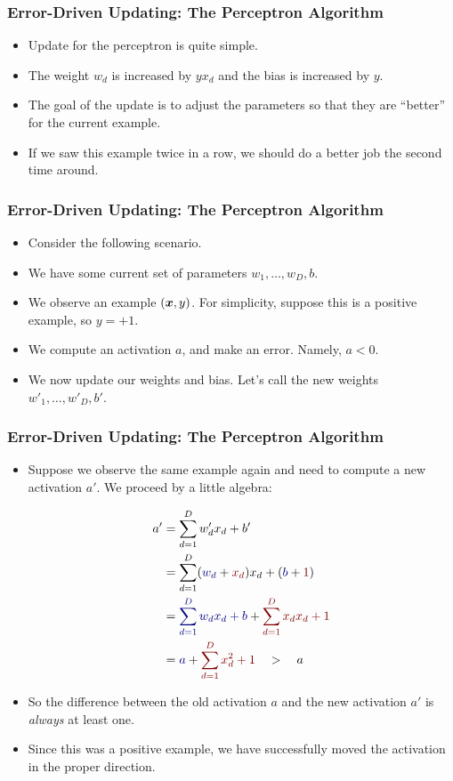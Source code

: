 \documentclass[trans]{beamer}
\begin{document}
\begin{frame}
  \frametitle{Error-Driven Updating: The Perceptron Algorithm}
\begin{itemize}
\item
Update for the perceptron is quite simple.  
\item The
weight $w_d$ is increased by $y x_d$ and the bias is increased by
$y$.  
\item The goal of the update is to adjust the parameters so that they
are ``better'' for the current example. 
\item If we saw
this example twice in a row, we should do a better job the second time
around.
\end{itemize}
\end{frame}

\begin{frame}
  \frametitle{Error-Driven Updating: The Perceptron Algorithm}
\begin{itemize}
\item
Consider the
following scenario.  
\item We have some current set of parameters $w_1,
\dots, w_D, b$.  
\item We observe an example $({\boldsymbol{x}},y)$.  For simplicity,
suppose this is a positive example, so $y=+1$.
\item  We compute an
activation $a$, and make an error.  Namely, $a<0$.  
\item We now update our
weights and bias.  Let's call the new weights $w'_1, \dots, w'_D,
b'$.  
\end{itemize}
\end{frame}

\begin{frame}
  \frametitle{Error-Driven Updating: The Perceptron Algorithm}
\begin{itemize}
\item Suppose we observe the same example again and need to compute a
new activation $a'$.  We proceed by a little algebra:
\begin{scriptsize}
\begin{align}
a'
&= \sum_{d=1}^D w'_d x_d + b' \\
&= \sum_{d=1}^D (\textcolor{darkblue}{w_d} + \textcolor{darkred}{x_d}) x_d + (\textcolor{darkblue}{b} + \textcolor{darkred}{1}) \\
&= \textcolor{darkblue}{\sum_{d=1}^D w_d x_d + b} + \textcolor{darkred}{\sum_{d=1}^D x_d x_d + 1} \\
&= \textcolor{darkblue}{a} + \textcolor{darkred}{\sum_{d=1}^D x_d^2 + 1}
\quad > \quad a
\end{align}
\end{scriptsize}
\item 
So the difference between the old activation $a$ and the new
activation $a'$ is \emph{always} at least one.
\item   Since this
was a positive example, we have successfully moved the activation in
the proper direction.
\end{itemize}
\end{frame}
\end{document}
